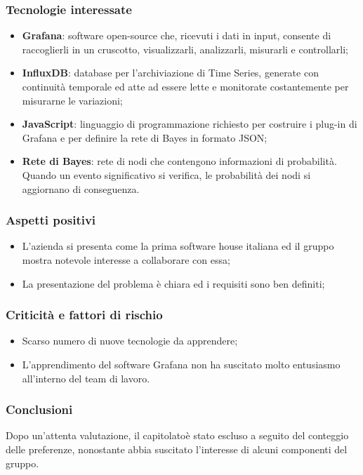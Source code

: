 \subsubsection{Tecnologie interessate}
\begin{itemize}
	\item \textbf{Grafana}: software open-source\glo{} che, ricevuti i dati in 
input,
	 consente di raccoglierli in un cruscotto, visualizzarli, analizzarli, 
	 misurarli e controllarli;
	\item \textbf{InfluxDB}: database per l'archiviazione di Time Series\glo{}, generate con 
continuità
	 temporale ed atte ad essere lette e monitorate costantemente per misurarne 
	 le variazioni;
	\item \textbf{JavaScript}: linguaggio di programmazione richiesto per costruire i plug-in\glo{} di Grafana e per definire la rete di Bayes\glo{} in formato JSON\glo;
	\item \textbf{Rete di Bayes}: rete di nodi che contengono informazioni di 
probabilità. Quando un evento significativo si verifica, le probabilità dei nodi si aggiornano di conseguenza.
\end{itemize}
\subsubsection{Aspetti positivi}
\begin{itemize}
	\item L'azienda si presenta come la prima software house italiana ed il gruppo 
mostra 
	notevole interesse a collaborare con essa;
	\item La presentazione del problema è chiara ed i requisiti sono ben definiti;
\end{itemize}
\subsubsection{Criticità e fattori di rischio}
\begin{itemize}
	\item Scarso numero di nuove tecnologie da apprendere;
	\item L'apprendimento del software Grafana non ha suscitato molto 
	entusiasmo all'interno del team di lavoro.
\end{itemize}
\subsubsection{Conclusioni}
Dopo un'attenta valutazione, il capitolato\glosp è stato escluso a seguito del conteggio delle preferenze, nonostante abbia suscitato l'interesse di alcuni componenti del gruppo.

